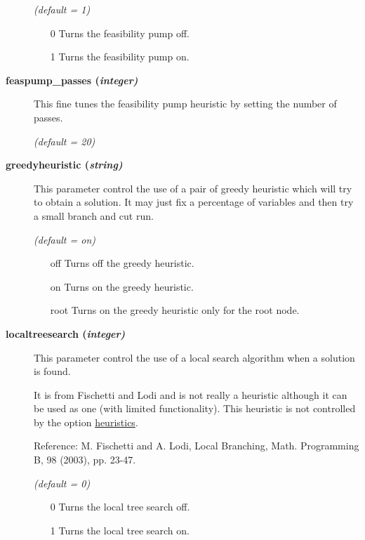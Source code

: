 \begin{description}
\textsl{(default = 1)}
\begin{itemize}
\item[0] 
Turns the feasibility pump off.
\item[1] 
Turns the feasibility pump on.
\end{itemize}

\item[\label{feaspump_passes}\hypertarget{feaspump_passes}
{\textbf{feaspump\_passes (\slshape{integer})}}]\hspace{1.0in}

This fine tunes the feasibility pump heuristic by setting the number of passes.

\textsl{(default = 20)}

\item[\label{greedyheuristic}\hypertarget{greedyheuristic}
{\textbf{greedyheuristic (\slshape{string})}}]\hspace{1.0in}

This parameter control the use of a pair of greedy heuristic which will try to obtain a solution.
It may just fix a percentage of variables and then try a small branch and cut run.

\textsl{(default = on)}
\begin{itemize}
\item[off] 
Turns off the greedy heuristic.
\item[on] 
Turns on the greedy heuristic.
\item[root] 
Turns on the greedy heuristic only for the root node.
\end{itemize}

\item[\label{localtreesearch}\hypertarget{localtreesearch}
{\textbf{localtreesearch (\slshape{integer})}}]\hspace{1.0in}

This parameter control the use of a local search algorithm when a solution is found.

It is from Fischetti and Lodi and is not really a heuristic although it can be used as one (with limited functionality).
This heuristic is not controlled by the option \hyperlink{heuristics}{heuristics}.

Reference: M. Fischetti and A. Lodi, Local Branching, Math. Programming B, 98 (2003), pp. 23-47.

\textsl{(default = 0)}
\begin{itemize}
\item[0] 
Turns the local tree search off.
\item[1] 
Turns the local tree search on.
\end{itemize}


\end{description}
